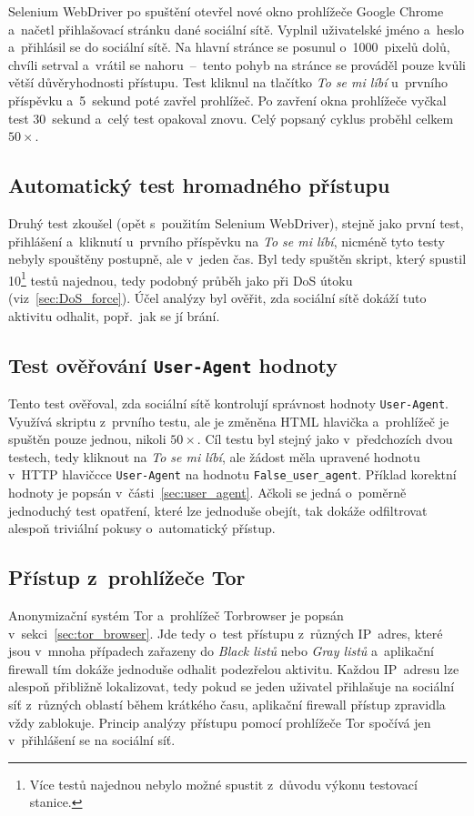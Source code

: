 Selenium WebDriver po spuštění otevřel nové okno prohlížeče Google Chrome a~načetl přihlašovací stránku dané sociální sítě. Vyplnil uživatelské jméno a~heslo a~přihlásil se do sociální sítě. Na hlavní stránce se posunul o~1000~pixelů dolů, chvíli setrval a~vrátil se nahoru~--~tento pohyb na stránce se prováděl pouze kvůli větší důvěryhodnosti přístupu. Test kliknul na tlačítko \textit{To se mi líbí} u~prvního příspěvku a~5~sekund poté zavřel prohlížeč. Po zavření okna prohlížeče vyčkal test 30~sekund a~celý test opakoval znovu. Celý popsaný cyklus proběhl celkem $50\times$.

\subsection*{Automatický test hromadného přístupu}
\label{sec:dos_test}
Druhý test zkoušel (opět s~použitím Selenium WebDriver), stejně jako první test, přihlášení a~kliknutí u~prvního příspěvku na \textit{To se mi líbí}, nicméně tyto testy nebyly spouštěny postupně, ale v~jeden čas. Byl tedy spuštěn skript, který spustil 10\footnote{Více testů najednou nebylo možné spustit z~důvodu výkonu testovací stanice.} testů najednou, tedy podobný průběh jako při DoS útoku (viz~\ref{sec:DoS_force}). Účel analýzy byl ověřit, zda sociální sítě dokáží tuto aktivitu odhalit, popř.~jak se jí brání.

\subsection*{Test ověřování \texttt{User-Agent} hodnoty}
Tento test ověřoval, zda sociální sítě kontrolují správnost hodnoty \texttt{User-Agent}. Využívá skriptu z~prvního testu, ale je změněna HTML hlavička a~prohlížeč je spuštěn pouze jednou, nikoli $50\times$. Cíl testu byl stejný jako v~předchozích dvou testech, tedy kliknout na \textit{To se mi líbí}, ale žádost měla upravené hodnotu v~HTTP hlavičcce \texttt{User-Agent} na hodnotu \texttt{False\_user\_agent}. Příklad korektní hodnoty je popsán v~části~\ref{sec:user_agent}. Ačkoli se jedná o~poměrně jednoduchý test opatření, které lze jednoduše obejít, tak dokáže odfiltrovat alespoň triviální pokusy o~automatický přístup.

\subsection*{Přístup z~prohlížeče Tor}
Anonymizační systém Tor a~prohlížeč Torbrowser je popsán v~sekci~\ref{sec:tor_browser}. Jde tedy o~test přístupu z~různých IP~adres, které jsou v~mnoha případech zařazeny do \textit{Black listů} nebo \textit{Gray listů} a~aplikační firewall tím dokáže jednoduše odhalit podezřelou aktivitu. Každou IP~adresu lze alespoň přibližně lokalizovat, tedy pokud se jeden uživatel přihlašuje na sociální síť z~různých oblastí během krátkého času, aplikační firewall přístup zpravidla vždy zablokuje. Princip analýzy přístupu pomocí prohlížeče Tor spočívá jen v~přihlášení se na sociální síť.

